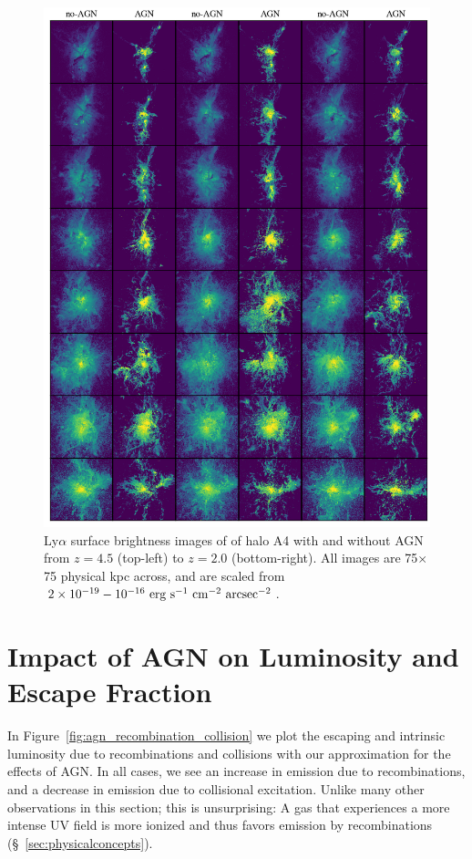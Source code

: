 \begin{figure}
    \centering
    \includegraphics[width=\textwidth,keepaspectratio]{figures/agn_rogues_A4.png}
    \caption{
        Ly$\alpha$ surface brightness images of of halo A4 with and without AGN from $z=4.5$ (top-left) to $z=2.0$ (bottom-right).
        All images are 75$\times$75 physical kpc across, and are scaled from $2\times10^{-19}-10^{-16}\ \rm{erg}\ \rm{s}^{-1}\ \rm{cm}^{-2}\ \rm{arcsec}^{-2}$.
    }
  \label{fig:agn_rogues4}
\end{figure}


\section{Impact of AGN on Luminosity and Escape Fraction}
\label{sec:agn_blob_luminosity}
In Figure~\ref{fig:agn_recombination_collision} we plot the escaping and intrinsic luminosity due to recombinations and collisions with our approximation for the effects of AGN.
In all cases, we see an increase in emission due to recombinations, and a decrease in emission due to collisional excitation.
Unlike many other observations in this section; this is unsurprising: A gas that experiences a more intense UV field is more ionized and thus favors emission by recombinations (\S~\ref{sec:physicalconcepts}).

